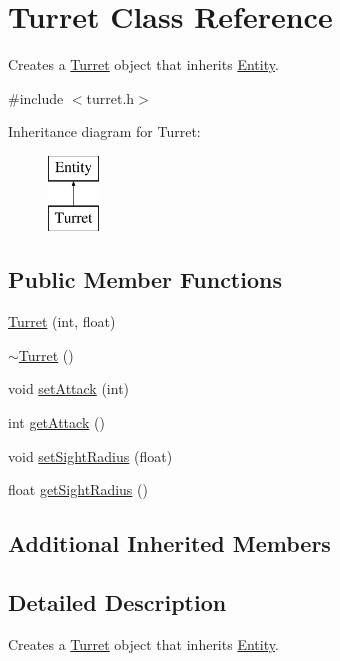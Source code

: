 \hypertarget{class_turret}{\section{Turret Class Reference}
\label{class_turret}
}


Creates a \hyperlink{class_turret}{Turret} object that inherits \hyperlink{class_entity}{Entity}.  




{\ttfamily \#include $<$turret.\+h$>$}

Inheritance diagram for Turret\+:\begin{figure}[H]
\begin{center}
\leavevmode
\includegraphics[height=2.000000cm]{class_turret}
\end{center}
\end{figure}
\subsection*{Public Member Functions}
\begin{DoxyCompactItemize}
\item 
\hyperlink{class_turret_a29d44eb8c797714c03a61563ddc1330d}{Turret} (int, float)
\item 
\hyperlink{class_turret_add5c91873b2baa27a3aa7a2a4c55e58c}{$\sim$\+Turret} ()
\item 
void \hyperlink{class_turret_ae6c2f4400a61eb11ae37855f818b253c}{set\+Attack} (int)
\item 
int \hyperlink{class_turret_a9020a9725e9de7c8c415ed5716883883}{get\+Attack} ()
\item 
void \hyperlink{class_turret_ab157dd2985dbbe140b80b446aac50edf}{set\+Sight\+Radius} (float)
\item 
float \hyperlink{class_turret_a5f9bb5c3726369bc39a514f657e58e4e}{get\+Sight\+Radius} ()
\end{DoxyCompactItemize}
\subsection*{Additional Inherited Members}


\subsection{Detailed Description}
Creates a \hyperlink{class_turret}{Turret} object that inherits \hyperlink{class_entity}{Entity}. 


